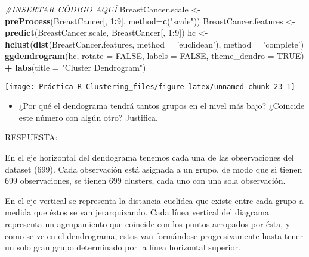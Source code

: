 \documentclass[
]{article}
\newenvironment{Shaded}{\begin{snugshade}}{\end{snugshade}}
\newcommand{\CommentTok}[1]{\textcolor[rgb]{0.56,0.35,0.01}{\textit{#1}}}
\newcommand{\DataTypeTok}[1]{\textcolor[rgb]{0.13,0.29,0.53}{#1}}
\newcommand{\DecValTok}[1]{\textcolor[rgb]{0.00,0.00,0.81}{#1}}
\newcommand{\KeywordTok}[1]{\textcolor[rgb]{0.13,0.29,0.53}{\textbf{#1}}}
\newcommand{\NormalTok}[1]{#1}
\newcommand{\OperatorTok}[1]{\textcolor[rgb]{0.81,0.36,0.00}{\textbf{#1}}}
\newcommand{\OtherTok}[1]{\textcolor[rgb]{0.56,0.35,0.01}{#1}}
\newcommand{\StringTok}[1]{\textcolor[rgb]{0.31,0.60,0.02}{#1}}
\providecommand{\tightlist}{%
  \setlength{\itemsep}{0pt}\setlength{\parskip}{0pt}}
\begin{document}
\begin{Shaded}
\begin{Highlighting}[]
\CommentTok{#INSERTAR CÓDIGO AQUÍ}
\NormalTok{BreastCancer.scale <-}\StringTok{ }\KeywordTok{preProcess}\NormalTok{(BreastCancer[, }\DecValTok{1}\OperatorTok{:}\DecValTok{9}\NormalTok{], }\DataTypeTok{method=}\KeywordTok{c}\NormalTok{(}\StringTok{"scale"}\NormalTok{))}
\NormalTok{BreastCancer.features <-}\StringTok{ }\KeywordTok{predict}\NormalTok{(BreastCancer.scale, BreastCancer[, }\DecValTok{1}\OperatorTok{:}\DecValTok{9}\NormalTok{])}
\NormalTok{hc <-}\StringTok{ }\KeywordTok{hclust}\NormalTok{(}\KeywordTok{dist}\NormalTok{(BreastCancer.features, }\DataTypeTok{method =} \StringTok{'euclidean'}\NormalTok{), }\DataTypeTok{method =} \StringTok{'complete'}\NormalTok{)}
\KeywordTok{ggdendrogram}\NormalTok{(hc, }\DataTypeTok{rotate =} \OtherTok{FALSE}\NormalTok{, }\DataTypeTok{labels =} \OtherTok{FALSE}\NormalTok{, }\DataTypeTok{theme_dendro =} \OtherTok{TRUE}\NormalTok{) }\OperatorTok{+}\StringTok{ }
\StringTok{  }\KeywordTok{labs}\NormalTok{(}\DataTypeTok{title =} \StringTok{"Cluster Dendrogram"}\NormalTok{)}
\end{Highlighting}
\end{Shaded}

\begin{center}\texttt{[image: Práctica-R-Clustering\_files/figure-latex/unnamed-chunk-23-1]} \end{center}

\begin{itemize}
\tightlist
\item
  ¿Por qué el dendograma tendrá tantos grupos en el nivel más bajo?
  ¿Coincide este número con algún otro? Justifica.
\end{itemize}

RESPUESTA:

En el eje horizontal del dendograma tenemos cada una de las
observaciones del dataset (699). Cada observación está asignada a un
grupo, de modo que si tienen 699 observaciones, se tienen 699 clusters,
cada uno con una sola observación.

En el eje vertical se representa la distancia euclídea que existe entre
cada grupo a medida que éstos se van jerarquizando. Cada línea vertical
del diagrama representa un agrupamiento que coincide con los puntos
arropados por ésta, y como se ve en el dendrograma, estos van formándose
progresivamente hasta tener un solo gran grupo determinado por la línea
horizontal superior.
\end{document}
